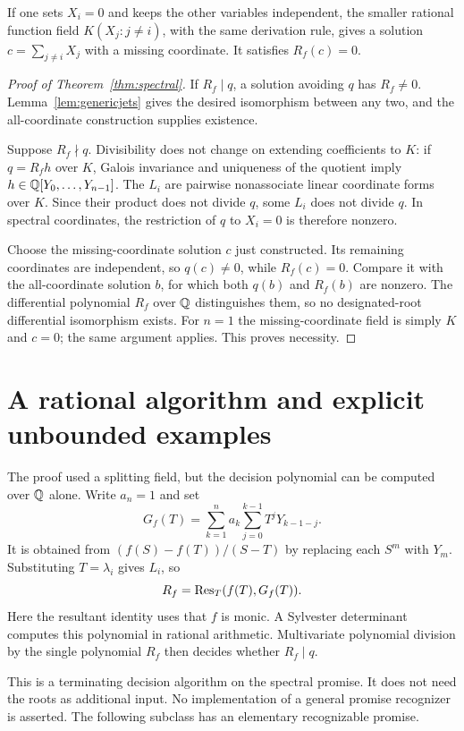 \documentclass[11pt]{article}
\begin{document}
If one sets $X_i=0$ and keeps the other variables independent, the
smaller rational function field $K(X_j:j\ne i)$, with the same
derivation rule, gives a solution $c=\sum_{j\ne i}X_j$ with a
missing coordinate. It satisfies $R_f(c)=0$.

\begin{proof}[Proof of Theorem~\ref{thm:spectral}]
If $R_f\mid q$, a solution avoiding $q$ has $R_f\ne0$.
Lemma~\ref{lem:genericjets} gives the desired isomorphism between
any two, and the all-coordinate construction supplies existence.

Suppose $R_f\nmid q$. Divisibility does not change on extending
coefficients to $K$: if $q=R_fh$ over $K$, Galois invariance and
uniqueness of the quotient imply $h\in\mathbb Q[Y_0,\ldots,Y_{n-1}]$.
The $L_i$ are pairwise nonassociate linear coordinate forms over $K$.
Since their product does not divide $q$, some $L_i$ does not divide
$q$. In spectral coordinates, the restriction of $q$ to $X_i=0$
is therefore nonzero.

Choose the missing-coordinate solution $c$ just constructed. Its
remaining coordinates are independent, so $q(c)\ne0$, while
$R_f(c)=0$. Compare it with the all-coordinate solution $b$, for
which both $q(b)$ and $R_f(b)$ are nonzero. The differential
polynomial $R_f$ over $\mathbb Q$ distinguishes them, so no
designated-root differential isomorphism exists. For $n=1$ the
missing-coordinate field is simply $K$ and $c=0$; the same
argument applies. This proves necessity.
\end{proof}

\section{A rational algorithm and explicit unbounded examples}

The proof used a splitting field, but the decision polynomial can
be computed over $\mathbb Q$ alone. Write $a_n=1$ and set
\[
 G_f(T)=\sum_{k=1}^n a_k\sum_{j=0}^{k-1}T^jY_{k-1-j}.
\]
It is obtained from $(f(S)-f(T))/(S-T)$ by replacing each $S^m$
with $Y_m$. Substituting $T=\lambda_i$ gives $L_i$, so
\begin{equation}\label{eq:resultant}
 R_f=\operatorname{Res}_T(f(T),G_f(T)).
\end{equation}
Here the resultant identity uses that $f$ is monic. A Sylvester
determinant computes this polynomial in rational arithmetic.
Multivariate polynomial division by the single polynomial $R_f$
then decides whether $R_f\mid q$.

This is a terminating decision algorithm on the spectral promise.
It does not need the roots as additional input. No implementation
of a general promise recognizer is asserted. The following
subclass has an elementary recognizable promise.
\end{document}
